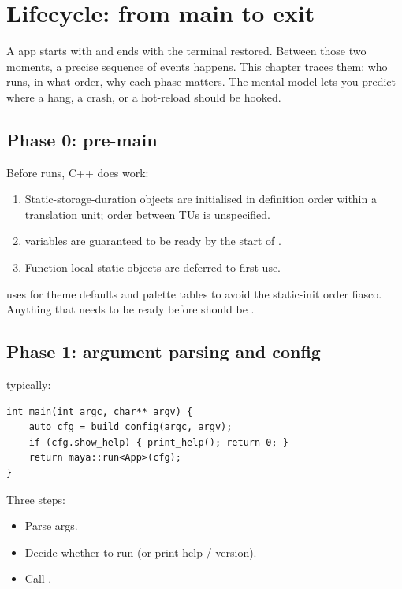 \chapter{Lifecycle: from main to exit}
\label{ch:lifecycle}

\begin{aside}
A \maya{} app starts with  and ends with the
terminal restored. Between those two moments, a precise sequence
of events happens. This chapter traces them: who runs, in what
order, why each phase matters. The mental model lets you
predict where a hang, a crash, or a hot-reload should be hooked.
\end{aside}

\section{Phase 0: pre-main}

Before  runs, C++ does work:

\begin{enumerate}[leftmargin=*]
  \item Static-storage-duration objects are initialised in
    definition order within a translation unit; order between
    TUs is unspecified.
  \item {} variables are guaranteed to be ready
    by the start of .
  \item Function-local static objects are deferred to first use.
\end{enumerate}

\maya{} uses  for theme defaults and palette
tables to avoid the static-init order fiasco. Anything that
needs to be ready before  should be .

\section{Phase 1: argument parsing and config}

 typically:

\begin{lstlisting}
int main(int argc, char** argv) {
    auto cfg = build_config(argc, argv);
    if (cfg.show_help) { print_help(); return 0; }
    return maya::run<App>(cfg);
}
\end{lstlisting}

Three steps:

\begin{itemize}[leftmargin=*]
  \item Parse args.
  \item Decide whether to run (or print help / version).
  \item Call .
\end{itemize}

